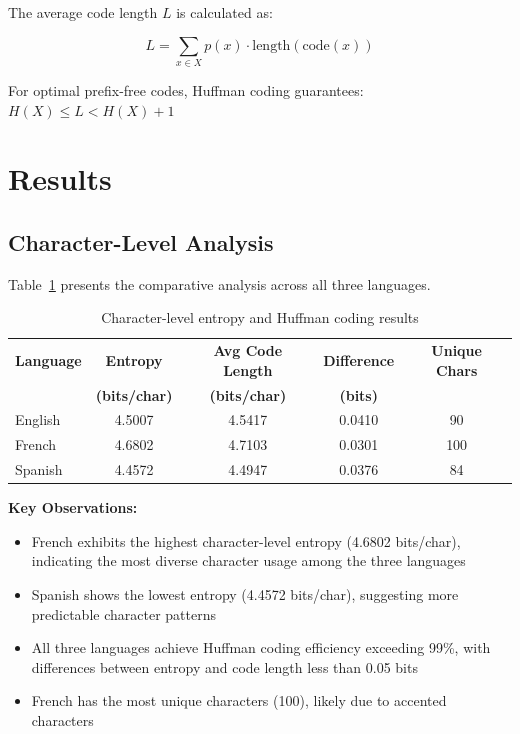 \documentclass[11pt,a4paper]{article}
\begin{document}
The average code length $L$ is calculated as:

\begin{equation}
L = \sum_{x \in X} p(x) \cdot \text{length}(\text{code}(x))
\end{equation}

For optimal prefix-free codes, Huffman coding guarantees: $H(X) \leq L < H(X) + 1$

\section{Results}

\subsection{Character-Level Analysis}

Table~\ref{tab:results} presents the comparative analysis across all three languages.

\begin{table}[H]
\centering
\begin{tabular}{|l|c|c|c|c|}
\hline
\textbf{Language} & \textbf{Entropy} & \textbf{Avg Code Length} & \textbf{Difference} & \textbf{Unique Chars} \\
& \textbf{(bits/char)} & \textbf{(bits/char)} & \textbf{(bits)} & \\
\hline
English & 4.5007 & 4.5417 & 0.0410 & 90 \\
French & 4.6802 & 4.7103 & 0.0301 & 100 \\
Spanish & 4.4572 & 4.4947 & 0.0376 & 84 \\
\hline
\end{tabular}
\caption{Character-level entropy and Huffman coding results}
\label{tab:results}
\end{table}

\textbf{Key Observations:}

\begin{itemize}
    \item French exhibits the highest character-level entropy (4.6802 bits/char), indicating the most diverse character usage among the three languages
    \item Spanish shows the lowest entropy (4.4572 bits/char), suggesting more predictable character patterns
    \item All three languages achieve Huffman coding efficiency exceeding 99\%, with differences between entropy and code length less than 0.05 bits
    \item French has the most unique characters (100), likely due to accented characters
\end{itemize}
\end{document}
